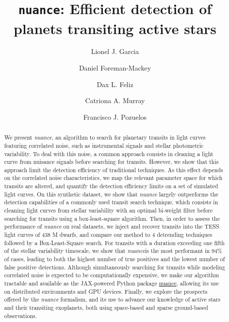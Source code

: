 \documentclass[modern]{aastex631}
\newcommand{\nuancemethod}{\textit{nuance}}
\newcommand{\nuancecode}{\textsf{nuance}}
\begin{document}
\title{\texttt{nuance}: Efficient detection of planets transiting active stars}

\author{Lionel J. Garcia}
\author{Daniel Foreman-Mackey}
\author{Dax L. Feliz}
\author{Catriona A. Murray}
\author{Francisco J. Pozuelos}


\begin{abstract}
    We present \nuancemethod{}, an algorithm to search for planetary transits in light curves featuring correlated noise, such as instrumental signals and stellar photometric variability. To deal with this noise, a common approach consists in cleaning a light curve from nuisance signals before searching for transits. However, we show that this approach limit the detection efficiency of traditional techniques. As this effect depends on the correlated noise characteristics, we map the relevant parameter space for which transits are altered, and quantify the detection efficiency limits on a set of simulated light curves. On this synthetic dataset, we show that \nuancemethod{} largely outperforms the detection capabilities of a commonly used transit search technique, which consists in cleaning light curves from stellar variability with an optimal bi-weight filter before searching for transits using a box-least-square algorithm. Then, in order to assess the performance of \nuancemethod{} on real datasets, we inject and recover transits into the TESS light curves of 438 M dwarfs, and compare our method to 4 detrending techniques followed by a Box-Least-Square search. For transits with a duration exceeding one fifth of the stellar variability timescale, we show that \nuancemethod is the most performant in 94\% of cases, leading to both the highest number of true positives and the lowest number of false positive detections. Although simultaneously searching for transits while modeling correlated noise is expected to be computationally expensive, we make our algorithm tractable and available as the \textsf{JAX}-powered Python package \href{https://github.com/lgrcia/nuance}{\nuancecode{}}, allowing its use on distributed environments and GPU devices. Finally, we explore the prospects offered by the \nuancemethod{} formalism, and its use to advance our knowledge of active stars and their transiting exoplanets, both using space-based and sparse ground-based observations.
\end{abstract}
\end{document}
